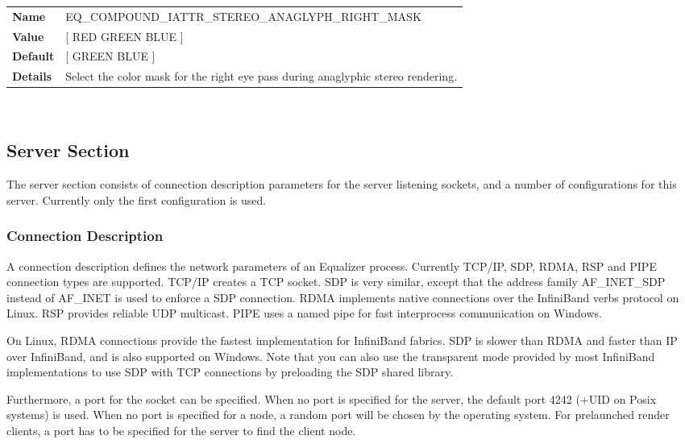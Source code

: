 \documentclass[10pt,a4]{scrartcl}
\begin{document}
\begin{center}
\begin{tabularx}{\textwidth}{|l|X|}
  \hline
  \textbf{Name} & EQ\_COMPOUND\_IATTR\_STEREO\_ANAGLYPH\_RIGHT\_MASK\\
  \textbf{Value} & [ RED GREEN BLUE ]\\
  \textbf{Default} & [ GREEN BLUE ]\\
  \textbf{Details} & Select the color mask for the right eye pass during
  anaglyphic stereo rendering.\\
  \hline
\end{tabularx}\\
\end{center}

\subsection{Server Section}

The server section consists of connection description parameters for the
server listening sockets, and a number of configurations for this
server. Currently only the first configuration is used.

\subsubsection{\label{sConnectionDescription}Connection Description}

A connection description defines the network parameters of an Equalizer
process. Currently TCP/IP, SDP, RDMA, RSP and PIPE connection types are
supported. TCP/IP creates a TCP socket. SDP is very similar, except that the
address family \textsf{AF\_INET\_SDP} instead of \textsf{AF\_INET} is used to
enforce a SDP connection. RDMA implements native connections over the InfiniBand
verbs protocol on Linux. RSP provides reliable UDP multicast. PIPE uses a named
pipe for fast interprocess communication on Windows.

On Linux, RDMA connections provide the fastest implementation for InfiniBand
fabrics. SDP is slower than RDMA and faster than IP over InfiniBand, and is also
supported on Windows. Note that you can also use the transparent mode provided
by most InfiniBand implementations to use SDP with TCP connections by preloading
the SDP shared library.

Furthermore, a port for the socket can be specified. When no port is specified
for the server, the default port 4242 (+UID on Posix systems) is used. When no
port is specified for a node, a random port will be chosen by the operating
system. For prelaunched render clients, a port has to be specified for the
server to find the client node.
\end{document}
